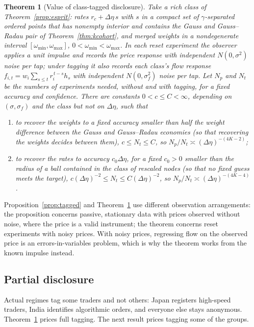 \documentclass[12pt]{article}
\newtheorem{theorem}{Theorem}[section]
\theoremstyle{definition}
\theoremstyle{remark}
\begin{document}
\begin{theorem}[Value of class-tagged disclosure]\label{thm:discvalue}
Take a rich class of Theorem~\ref{prop:esprit}: rates $r_c+\Delta\eta\,s$ with $s$ in a compact set of $\gamma$-separated ordered points that has nonempty interior and contains the Gauss and Gauss--Radau pair of Theorem~\ref{thm:kcohort}, and merged weights in a nondegenerate interval $[\omega_{\min},\omega_{\max}]$, $0<\omega_{\min}<\omega_{\max}$. In each reset experiment the observer applies a unit impulse and records the price response with independent $N(0,\sigma^2)$ noise per tap; under tagging it also records each class's flow response $f_{i,t}=w_i\sum_{s\le t}r_i^{\,t-s}h_s$ with independent $N(0,\sigma_f^2)$ noise per tap. Let $N_p$ and $N_t$ be the numbers of experiments needed, without and with tagging, for a fixed accuracy and confidence. There are constants $0<c\le C<\infty$, depending on $(\sigma,\sigma_f)$ and the class but not on $\Delta\eta$, such that
\begin{enumerate}[label=(\roman*),itemsep=1pt]
\item to recover the weights to a fixed accuracy smaller than half the weight difference between the Gauss and Gauss--Radau economies (so that recovering the weights decides between them), $c\le N_t\le C$, so $N_p/N_t\asymp(\Delta\eta)^{-(4K-2)}$;
\item to recover the rates to accuracy $c_0\Delta\eta$, for a fixed $c_0>0$ smaller than the radius of a ball contained in the class of rescaled nodes (so that no fixed guess meets the target), $c(\Delta\eta)^{-2}\le N_t\le C(\Delta\eta)^{-2}$, so $N_p/N_t\asymp(\Delta\eta)^{-(4K-4)}$.
\end{enumerate}
\end{theorem}

Proposition~\ref{prop:tagged} and Theorem~\ref{thm:discvalue} use different observation arrangements: the proposition concerns passive, stationary data with prices observed without noise, where the price is a valid instrument; the theorem concerns reset experiments with noisy prices. With noisy prices, regressing flow on the observed price is an errors-in-variables problem, which is why the theorem works from the known impulse instead.
\subsection{Partial disclosure}\label{sec:partial}

Actual regimes tag some traders and not others: Japan registers high-speed traders, India identifies algorithmic orders, and everyone else stays anonymous. Theorem~\ref{thm:discvalue} prices full tagging. The next result prices tagging some of the groups.
\end{document}
